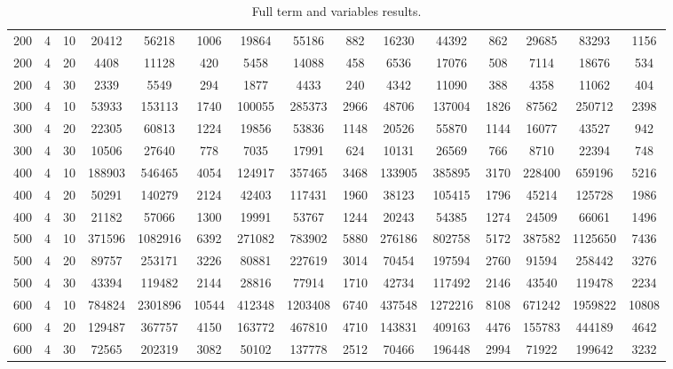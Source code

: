 \documentclass{article}
\begin{document}
\begin{table}[H]
\begin{center}
\begin{tabular}{| c | c | c | c | c | c | c | c | c | c | c | c | c | c | c |}
                    200 & 4 & 10 & 20412 & 56218 & 1006 & 19864 & 55186 & 882 & 16230 & 44392 & 862 & 29685 & 83293 & 1156 \\
                    200 & 4 & 20 & 4408 & 11128 & 420 & 5458 & 14088 & 458 & 6536 & 17076 & 508 & 7114 & 18676 & 534 \\
                    200 & 4 & 30 & 2339 & 5549 & 294 & 1877 & 4433 & 240 & 4342 & 11090 & 388 & 4358 & 11062 & 404 \\
                    300 & 4 & 10 & 53933 & 153113 & 1740 & 100055 & 285373 & 2966 & 48706 & 137004 & 1826 & 87562 & 250712 & 2398 \\
                    300 & 4 & 20 & 22305 & 60813 & 1224 & 19856 & 53836 & 1148 & 20526 & 55870 & 1144 & 16077 & 43527 & 942 \\
                    300 & 4 & 30 & 10506 & 27640 & 778 & 7035 & 17991 & 624 & 10131 & 26569 & 766 & 8710 & 22394 & 748 \\
                    400 & 4 & 10 & 188903 & 546465 & 4054 & 124917 & 357465 & 3468 & 133905 & 385895 & 3170 & 228400 & 659196 & 5216 \\
                    400 & 4 & 20 & 50291 & 140279 & 2124 & 42403 & 117431 & 1960 & 38123 & 105415 & 1796 & 45214 & 125728 & 1986 \\
                    400 & 4 & 30 & 21182 & 57066 & 1300 & 19991 & 53767 & 1244 & 20243 & 54385 & 1274 & 24509 & 66061 & 1496 \\
                    500 & 4 & 10 & 371596 & 1082916 & 6392 & 271082 & 783902 & 5880 & 276186 & 802758 & 5172 & 387582 & 1125650 & 7436 \\
                    500 & 4 & 20 & 89757 & 253171 & 3226 & 80881 & 227619 & 3014 & 70454 & 197594 & 2760 & 91594 & 258442 & 3276 \\
                    500 & 4 & 30 & 43394 & 119482 & 2144 & 28816 & 77914 & 1710 & 42734 & 117492 & 2146 & 43540 & 119478 & 2234 \\
                    600 & 4 & 10 & 784824 & 2301896 & 10544 & 412348 & 1203408 & 6740 & 437548 & 1272216 & 8108 & 671242 & 1959822 & 10808 \\
                    600 & 4 & 20 & 129487 & 367757 & 4150 & 163772 & 467810 & 4710 & 143831 & 409163 & 4476 & 155783 & 444189 & 4642 \\
                    600 & 4 & 30 & 72565 & 202319 & 3082 & 50102 & 137778 & 2512 & 70466 & 196448 & 2994 & 71922 & 199642 & 3232 \\
                \hline
            \end{tabular}
            \caption{Full term and variables results.}
            \label{tab:results-full-variables}
        \end{center}
    \end{table}


\newpage

 

\end{document}
